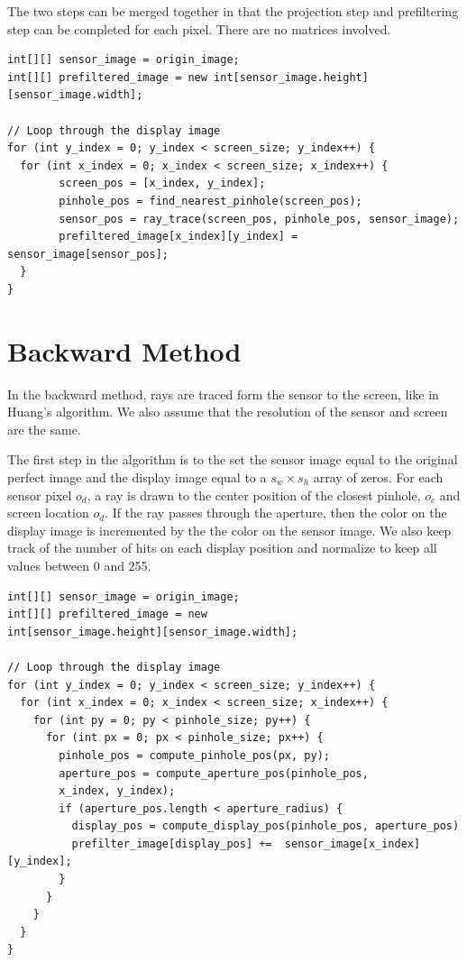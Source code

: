 The two steps can be merged together in that the projection step and prefiltering step can be completed for each pixel. There are no matrices involved.

\lstset {language=C++}
\begin{lstlisting}[frame=single, caption=Pseudocode For Prefiltering Algorithm]
int[][] sensor_image = origin_image;
int[][] prefiltered_image = new int[sensor_image.height][sensor_image.width];

// Loop through the display image
for (int y_index = 0; y_index < screen_size; y_index++) {
  for (int x_index = 0; x_index < screen_size; x_index++) {
        screen_pos = [x_index, y_index];
        pinhole_pos = find_nearest_pinhole(screen_pos);
        sensor_pos = ray_trace(screen_pos, pinhole_pos, sensor_image);
        prefiltered_image[x_index][y_index] = sensor_image[sensor_pos];
  }
}
\end{lstlisting}


\section{Backward Method}

In the backward method, rays are traced form the sensor to the screen, like in Huang's algorithm. We also assume that the resolution of the sensor and screen are the same. 

The first step in the algorithm is to the set the sensor image equal to the original perfect image and the display image equal to a $s_w \times s_h$ array of zeros. For each sensor pixel $o_d$, a ray is drawn to the center position of the closest pinhole, $o_c$ and screen location $o_d$. If the ray passes through the aperture, then the color on the display image is incremented by the the color on the sensor image. We also keep track of the number of hits on each display position and normalize to keep all values between 0 and 255.

\lstset {language=C++}
\begin{lstlisting}[frame=single, caption=Pseudocode For Prefiltering Algorithm]
int[][] sensor_image = origin_image;
int[][] prefiltered_image = new
int[sensor_image.height][sensor_image.width];

// Loop through the display image
for (int y_index = 0; y_index < screen_size; y_index++) {
  for (int x_index = 0; x_index < screen_size; x_index++) {
    for (int py = 0; py < pinhole_size; py++) {
      for (int px = 0; px < pinhole_size; px++) {
        pinhole_pos = compute_pinhole_pos(px, py);
        aperture_pos = compute_aperture_pos(pinhole_pos, 
        x_index, y_index);
        if (aperture_pos.length < aperture_radius) {
          display_pos = compute_display_pos(pinhole_pos, aperture_pos)
          prefilter_image[display_pos] +=  sensor_image[x_index][y_index];
        }
      }
    }
  }
}
\end{lstlisting}


